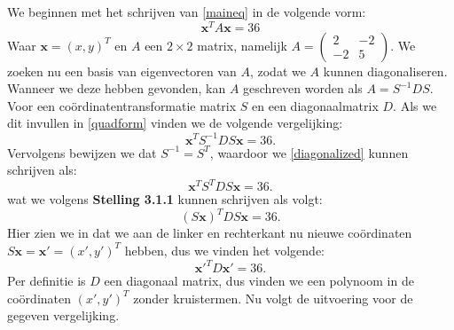\documentclass[12pt, dutch, a4paper]{article}
\theoremstyle{definition}
\begin{document}
\begin{enumerate}
    We beginnen met het schrijven van \cref{maineq} in de volgende vorm:
    \begin{equation}\label{quadform}
        \mathbf{x}^T A \mathbf{x} = 36
    \end{equation}
    Waar $\mathbf{x} = (x, y)^T$ en $A$ een $2\times 2$ matrix, namelijk 
    $A = \begin{pmatrix}
        2 & -2 \\
        -2 & 5
    \end{pmatrix}$. We zoeken nu een basis van eigenvectoren van $A$, zodat we $A$ kunnen diagonaliseren. Wanneer we deze hebben gevonden, kan $A$ geschreven worden als $A = S^{-1} D S$. Voor een coördinatentransformatie matrix $S$ en een diagonaalmatrix $D$. Als we dit invullen in \cref{quadform} vinden we de volgende vergelijking: 
    \begin{equation}\label{diagonalized}
        \mathbf{x}^T S^{-1} D S \mathbf{x} = 36.
    \end{equation} 
    Vervolgens bewijzen we dat $S^{-1} = S^T$, waardoor we \cref{diagonalized} kunnen schrijven als:
    \begin{equation}
        \mathbf{x}^T S^T D S \mathbf{x} = 36.
    \end{equation} 
    wat we volgens \textbf{Stelling 3.1.1} kunnen schrijven als volgt:
    \begin{equation}
        (S \mathbf{x})^T D S \mathbf{x} = 36.
    \end{equation}
    Hier zien we in dat we aan de linker en rechterkant nu nieuwe coördinaten $S\mathbf{x} = \mathbf{x'} = (x', y')^T$ hebben, dus we vinden het volgende:
    \begin{equation} \label{transed_eq}
        \mathbf{x'}^T D \mathbf{x'} = 36.
    \end{equation}
    Per definitie is $D$ een diagonaal matrix, dus vinden we een polynoom in de coördinaten $(x', y')^T$ zonder kruistermen. Nu volgt de uitvoering voor de gegeven vergelijking.


\end{enumerate}
\end{document}

